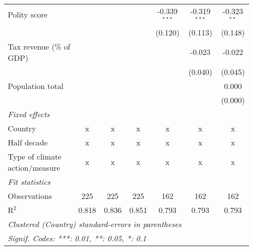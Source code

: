\begin{tabular}{lcccccc}
   Polity score                                                  &              &                &                & -0.339$^{***}$ & -0.319$^{***}$ & -0.323$^{**}$\\   
                                                                 &              &                &                & (0.120)        & (0.113)        & (0.148)\\   
   Tax revenue (\% of GDP)                                       &              &                &                &                & -0.023         & -0.022\\   
                                                                 &              &                &                &                & (0.040)        & (0.045)\\   
   Population total                                              &              &                &                &                &                & 0.000\\   
                                                                 &              &                &                &                &                & (0.000)\\   
   \emph{Fixed effects}\\
   Country                                                       & x            & x              & x              & x              & x              & x\\  
   Half decade                                                   & x            & x              & x              & x              & x              & x\\  
   Type of climate action/measure                                & x            & x              & x              & x              & x              & x\\  
   \midrule \emph{Fit statistics}\\
   Observations                                                  & 225          & 225            & 225            & 162            & 162            & 162\\  
   R$^2$                                                         & 0.818        & 0.836          & 0.851          & 0.793          & 0.793          & 0.793\\  
   \midrule
   \multicolumn{7}{l}{\emph{Clustered (Country) standard-errors in parentheses}}\\
   \multicolumn{7}{l}{\emph{Signif. Codes: ***: 0.01, **: 0.05, *: 0.1}}\\
\end{tabular}
\par\endgroup


